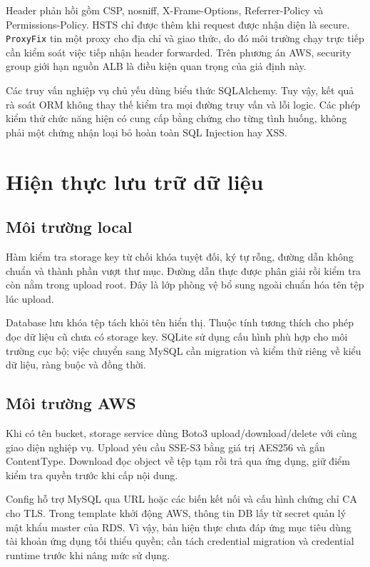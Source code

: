 Header phản hồi gồm CSP, nosniff, X-Frame-Options, Referrer-Policy và Permissions-Policy. HSTS chỉ được thêm khi request được nhận diện là secure. \texttt{ProxyFix} tin một proxy cho địa chỉ và giao thức, do đó môi trường chạy trực tiếp cần kiểm soát việc tiếp nhận header forwarded. Trên phương án AWS, security group giới hạn nguồn ALB là điều kiện quan trọng của giả định này.

Các truy vấn nghiệp vụ chủ yếu dùng biểu thức SQLAlchemy. Tuy vậy, kết quả rà soát ORM không thay thế kiểm tra mọi đường truy vấn và lỗi logic. Các phép kiểm thử chức năng hiện có cung cấp bằng chứng cho từng tình huống, không phải một chứng nhận loại bỏ hoàn toàn SQL Injection hay XSS.

\section{Hiện thực lưu trữ dữ liệu}
\subsection{Môi trường local}
Hàm kiểm tra storage key từ chối khóa tuyệt đối, ký tự rỗng, đường dẫn không chuẩn và thành phần vượt thư mục. Đường dẫn thực được phân giải rồi kiểm tra còn nằm trong upload root. Đây là lớp phòng vệ bổ sung ngoài chuẩn hóa tên tệp lúc upload.

Database lưu khóa tệp tách khỏi tên hiển thị. Thuộc tính tương thích cho phép đọc dữ liệu cũ chưa có storage key. SQLite sử dụng cấu hình phù hợp cho môi trường cục bộ; việc chuyển sang MySQL cần migration và kiểm thử riêng về kiểu dữ liệu, ràng buộc và đồng thời.
\subsection{Môi trường AWS}
Khi có tên bucket, storage service dùng Boto3 upload/download/delete với cùng giao diện nghiệp vụ. Upload yêu cầu SSE-S3 bằng giá trị AES256 và gắn ContentType. Download đọc object về tệp tạm rồi trả qua ứng dụng, giữ điểm kiểm tra quyền trước khi cấp nội dung.

Config hỗ trợ MySQL qua URL hoặc các biến kết nối và cấu hình chứng chỉ CA cho TLS. Trong template khởi động AWS, thông tin DB lấy từ secret quản lý mật khẩu master của RDS. Vì vậy, bản hiện thực chưa đáp ứng mục tiêu dùng tài khoản ứng dụng tối thiểu quyền; cần tách credential migration và credential runtime trước khi nâng mức sử dụng.

